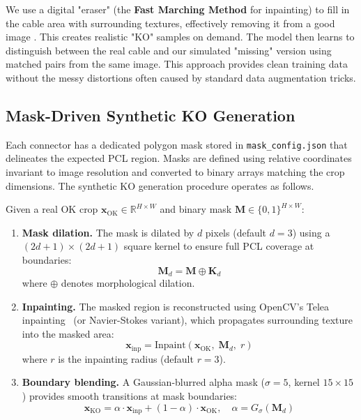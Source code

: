 \documentclass[11pt,a4paper]{article}
\begin{document}
We use a digital "eraser" (the \textbf{Fast Marching Method} for inpainting) to fill in the cable area with surrounding textures, effectively removing it from a good image \cite{telea2004inpainting}. This creates realistic "KO" samples on demand. The model then learns to distinguish between the real cable and our simulated "missing" version using matched pairs from the same image. This approach provides clean training data without the messy distortions often caused by standard data augmentation tricks.

\subsection{Mask-Driven Synthetic KO Generation}

Each connector has a dedicated polygon mask stored in \texttt{mask\_config.json} that delineates the expected PCL region. Masks are defined using relative coordinates invariant to image resolution and converted to binary arrays matching the crop dimensions. The synthetic KO generation procedure operates as follows.

Given a real OK crop $\mathbf{x}_{\mathrm{OK}} \in \mathbb{R}^{H \times W}$ and binary mask $\mathbf{M} \in \{0, 1\}^{H \times W}$:

\begin{enumerate}[nosep]
    \item \textbf{Mask dilation.} The mask is dilated by $d$ pixels (default $d=3$) using a $(2d+1) \times (2d+1)$ square kernel to ensure full PCL coverage at boundaries:
    \begin{equation}
        \mathbf{M}_d = \mathbf{M} \oplus \mathbf{K}_d
    \end{equation}
    where $\oplus$ denotes morphological dilation.
    
    \item \textbf{Inpainting.} The masked region is reconstructed using OpenCV's Telea inpainting~\cite{telea2004inpainting} (or Navier-Stokes variant), which propagates surrounding texture into the masked area:
    \begin{equation}
        \mathbf{x}_{\mathrm{inp}} = \mathrm{Inpaint}(\mathbf{x}_{\mathrm{OK}},\; \mathbf{M}_d,\; r)
    \end{equation}
    where $r$ is the inpainting radius (default $r=3$).
    
    \item \textbf{Boundary blending.} A Gaussian-blurred alpha mask ($\sigma=5$, kernel $15 \times 15$) provides smooth transitions at mask boundaries:
    \begin{equation}
        \mathbf{x}_{\mathrm{KO}} = \alpha \cdot \mathbf{x}_{\mathrm{inp}} + (1 - \alpha) \cdot \mathbf{x}_{\mathrm{OK}}, \quad \alpha = G_\sigma(\mathbf{M}_d)
    \end{equation}
\end{enumerate}
\end{document}
